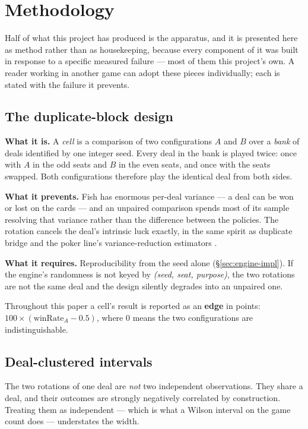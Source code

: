 \section{Methodology}
\label{sec:methodology}

Half of what this project has produced is the apparatus, and it is presented here as method rather
than as housekeeping, because every component of it was built in response to a specific measured
failure --- most of them this project's own. A reader working in another game can adopt these
pieces individually; each is stated with the failure it prevents.

\subsection{The duplicate-block design}
\label{sec:methodology-duplicate}

\textbf{What it is.} A \emph{cell} is a comparison of two configurations $A$ and $B$ over a
\emph{bank} of deals identified by one integer seed. Every deal in the bank is played twice: once
with $A$ in the odd seats and $B$ in the even seats, and once with the seats swapped. Both
configurations therefore play the identical deal from both sides.

\textbf{What it prevents.} Fish has enormous per-deal variance --- a deal can be won or lost on the
cards --- and an unpaired comparison spends most of its sample resolving that variance rather than
the difference between the policies. The rotation cancels the deal's intrinsic luck exactly, in the
same spirit as duplicate bridge and the poker line's variance-reduction estimators
\cite{zinkevich-divat,burch-aivat}.

\textbf{What it requires.} Reproducibility from the seed alone (\S\ref{sec:engine-impl}). If the
engine's randomness is not keyed by \emph{(seed, seat, purpose)}, the two rotations are not the same
deal and the design silently degrades into an unpaired one.

Throughout this paper a cell's result is reported as an \textbf{edge} in points:
$100 \times (\text{winRate}_A - 0.5)$, where $0$ means the two configurations are indistinguishable.

\subsection{Deal-clustered intervals}
\label{sec:methodology-intervals}

The two rotations of one deal are \emph{not} two independent observations. They share a deal, and
their outcomes are strongly negatively correlated by construction. Treating them as independent ---
which is what a Wilson interval on the game count does --- understates the width.


